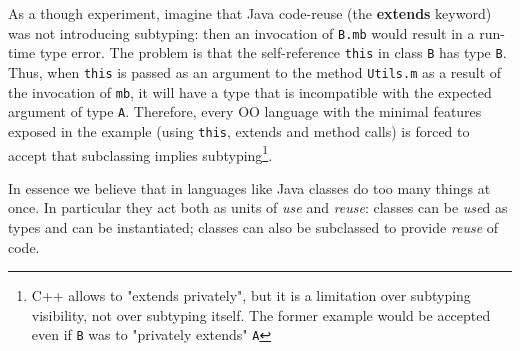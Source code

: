 As a though experiment, imagine that Java code-reuse (the {\bf extends} keyword) was not introducing subtyping: then an invocation of 
\lstinline{B.mb} would result in a run-time type error.
The problem is that the
self-reference \lstinline{this} in class \lstinline{B} has 
type \lstinline{B}. Thus, when \lstinline{this} is passed as an argument to 
the method \lstinline{Utils.m} as a result of the invocation of
\lstinline{mb}, it will have a type that is incompatible with the
expected argument of type \lstinline{A}.  
Therefore, every OO language with the minimal features exposed in the example (using \lstinline{this},
extends and method calls) is forced to accept that subclassing implies
subtyping\footnote{C++ allows to "extends privately", but it is a limitation over
  subtyping visibility, not over subtyping itself.  The
  former example would be accepted even if \lstinline{B} was to
  "privately extends" \lstinline{A}}.
  
In essence we believe that in languages like Java classes do too many
things at once. In particular they act both as units of \emph{use} and
\emph{reuse}: classes can be \emph{use}d as types and can be instantiated;
classes can also be subclassed to provide \emph{reuse} of code.

